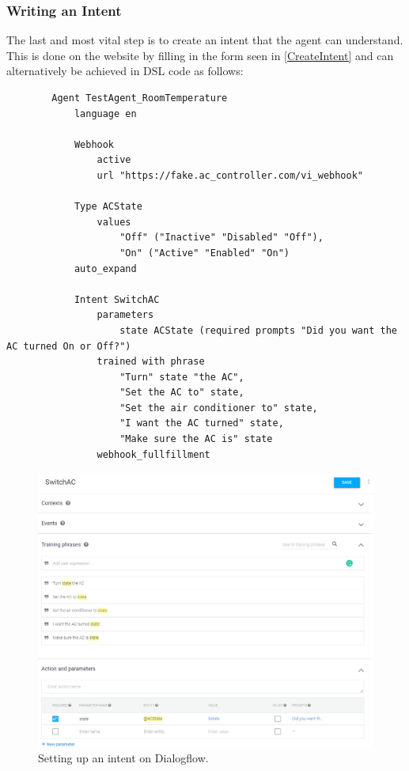 \subsubsection{Writing an Intent}
The last and most vital step is to create an intent that the agent can understand. This is done on the website by filling in the form seen in \autoref{CreateIntent} and can alternatively be achieved in DSL code as follows:
\begin{samepage}
    \begin{verbatim}
        Agent TestAgent_RoomTemperature
            language en 
                
            Webhook 
                active 
                url "https://fake.ac_controller.com/vi_webhook"

            Type ACState
                values 
                    "Off" ("Inactive" "Disabled" "Off"),
                    "On" ("Active" "Enabled" "On")
            auto_expand

            Intent SwitchAC
                parameters
                    state ACState (required prompts "Did you want the AC turned On or Off?")
                trained with phrase
                    "Turn" state "the AC",
                    "Set the AC to" state,
                    "Set the air conditioner to" state,
                    "I want the AC turned" state,
                    "Make sure the AC is" state
                webhook_fullfillment
    \end{verbatim}
\end{samepage}

\begin{figure}[ht]
    \centering
    \includegraphics[width=1\textwidth]{Thesis_Images/CreateIntent.PNG}
    \caption{Setting up an intent on Dialogflow.}
        \label{CreateIntent}
\end{figure}

